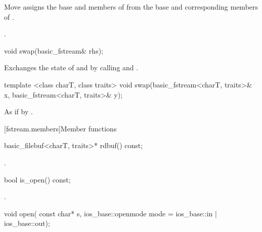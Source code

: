 \begin{itemdescr}
\pnum
\effects Move assigns the base and members of  from the base and corresponding
members of .

\pnum
\returns {}.
\end{itemdescr}

%
\begin{itemdecl}
void swap(basic_fstream& rhs);
\end{itemdecl}

\begin{itemdescr}
\pnum
\effects Exchanges the state of 
and  by calling
 and
.
\end{itemdescr}

%
\begin{itemdecl}
template <class charT, class traits>
  void swap(basic_fstream<charT, traits>& x,
            basic_fstream<charT, traits>& y);
\end{itemdecl}

\begin{itemdescr}
\pnum
\effects As if by .
\end{itemdescr}

[fstream.members]{Member functions}

%
\begin{itemdecl}
basic_filebuf<charT, traits>* rdbuf() const;
\end{itemdecl}

\begin{itemdescr}
\pnum
\returns
{}.
\end{itemdescr}

%
\begin{itemdecl}
bool is_open() const;
\end{itemdecl}

\begin{itemdescr}
\pnum
\returns
{}.
\end{itemdescr}

%
\begin{itemdecl}
void open(
  const char* s,
  ios_base::openmode mode = ios_base::in | ios_base::out);
\end{itemdecl}

